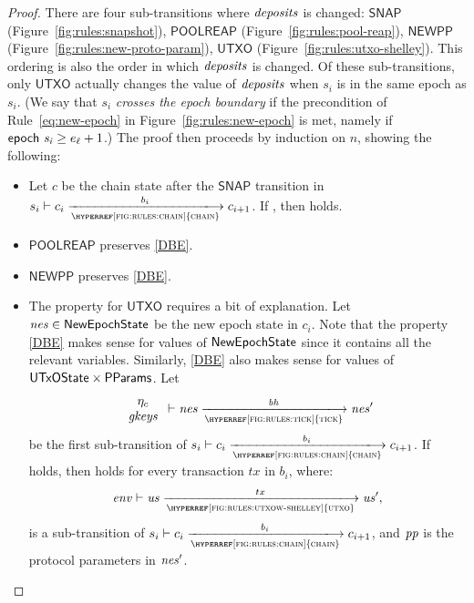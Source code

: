 \begin{proof}
  There are four sub-transitions where $\mathit{deposits}$ is changed:
  $\mathsf{SNAP}$ (Figure~\ref{fig:rules:snapshot}),
  $\mathsf{POOLREAP}$ (Figure~\ref{fig:rules:pool-reap}),
  $\mathsf{NEWPP}$ (Figure~\ref{fig:rules:new-proto-param}),
  $\mathsf{UTXO}$ (Figure~\ref{fig:rules:utxo-shelley}).
  This ordering is also the order in which $\mathit{deposits}$ is changed.
  Of these sub-transitions, only $\mathsf{UTXO}$ actually changes the value of $\mathit{deposits}$
  when $s_i$ is in the same epoch as $s_i$.
  (We say that $s_i$ \emph{crosses the epoch boundary} if the precondition of
  Rule~\ref{eq:new-epoch} in Figure~\ref{fig:rules:new-epoch} is met,
  namely if $\mathsf{epoch}~ \mathit{s_i} \ge e_\ell+1$.)
%
  The proof then proceeds by induction on $n$, showing the following:
  \begin{itemize}
    \item
      Let $c$ be the chain state after the $\mathsf{SNAP}$ transition
      in $s_i\vdash c_i\trans{\hyperref[fig:rules:chain]{chain}}{b_i}c_{i+1}$.
      If , then  holds.
    \item $\mathsf{POOLREAP}$ preserves \ref{DBE}.
    \item $\mathsf{NEWPP}$ preserves \ref{DBE}.
    \item The property for $\mathsf{UTXO}$ requires a bit of explanation.
      Let $\mathit{nes}\in\mathsf{NewEpochState}$ be the new epoch state in $c_i$.
      Note that the property \ref{DBE} makes sense for values of $\mathsf{NewEpochState}$
      since it contains all the relevant variables.
      Similarly, \ref{DBE} also makes sense for values of $\mathsf{UTxOState}\times\mathsf{PParams}$.
      Let
      $$
        {\begin{array}{c}
           \eta_c \\
           \var{gkeys} \\
         \end{array}}
        \vdash\var{nes}\trans{\hyperref[fig:rules:tick]{tick}}{\var{bh}}\var{nes'}
      $$
      be the first sub-transition of
      $s_i\vdash c_i\trans{\hyperref[fig:rules:chain]{chain}}{b_i}c_{i+1}$.
      If  holds, then  holds for every transaction
      $tx$ in $b_i$, where:
      $$
      \var{env}\vdash \var{us} \trans{\hyperref[fig:rules:utxow-shelley]{utxo}}{tx} \var{us'},
      $$
      is a sub-transition of
      $s_i\vdash c_i\trans{\hyperref[fig:rules:chain]{chain}}{b_i}c_{i+1}$,
      and $\mathit{pp}$ is the protocol parameters in $\mathit{nes'}$.
  \end{itemize}


\end{proof}
